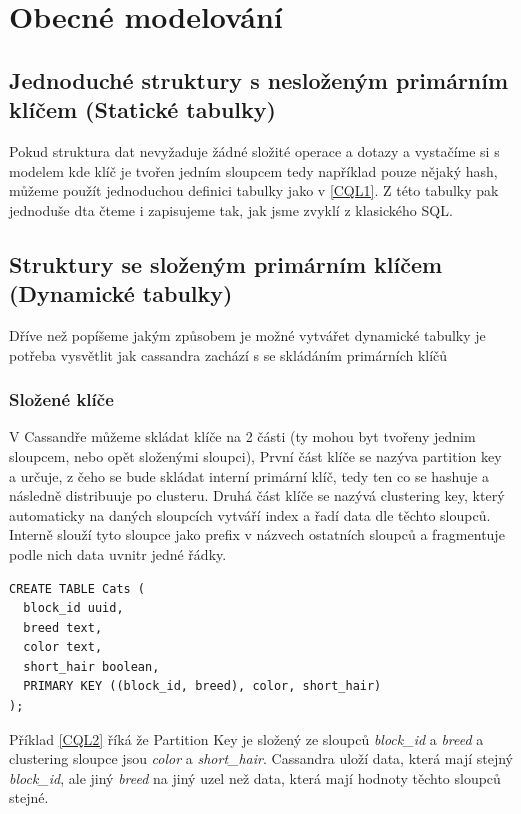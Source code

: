 \documentclass[thesis=M,czech]{FITthesis}[2012/06/26]
\begin{document}
\section{Obecné modelování}

\subsection{Jednoduché struktury s nesloženým primárním klíčem (Statické tabulky)}

Pokud struktura dat nevyžaduje žádné složité operace a dotazy a vystačíme si s modelem kde klíč je tvořen jedním sloupcem tedy například pouze nějaký hash, můžeme použít jednoduchou definici tabulky jako v \ref{CQL1}. Z této tabulky pak jednoduše dta čteme i zapisujeme tak, jak jsme zvyklí z klasického SQL.

\subsection{Struktury se složeným primárním klíčem (Dynamické tabulky)}

Dříve než popíšeme jakým způsobem je možné vytvářet dynamické tabulky je potřeba vysvětlit jak cassandra zachází s se skládáním primárních klíčů

\subsubsection*{Složené klíče}
V Cassandře můžeme skládat klíče na 2 části (ty mohou byt tvořeny jednim sloupcem, nebo opět složenými sloupci), První část klíče se nazýva partition key a určuje, z čeho se bude skládat interní primární klíč, tedy ten co se hashuje a následně distribuuje po clusteru. Druhá část klíče se nazývá clustering key, který automaticky na daných sloupcích vytváří index a řadí data dle těchto sloupců. Interně slouží tyto sloupce jako prefix v názvech ostatních sloupců a fragmentuje podle nich data uvnitr jedné řádky. 

\begin{lstlisting}[caption={Ukázka složených klíčů},label=CQL2]
CREATE TABLE Cats (
  block_id uuid,
  breed text,
  color text,
  short_hair boolean,
  PRIMARY KEY ((block_id, breed), color, short_hair)
);
\end{lstlisting}

Příklad \ref{CQL2} říká že Partition Key je složený ze sloupců \emph{block\_id} a  \emph{breed} a clustering sloupce jsou \emph{color} a \emph{short\_hair}. Cassandra uloží data, která mají stejný \emph{block\_id}, ale jiný \emph{breed} na jiný uzel než data, která mají hodnoty těchto sloupců stejné.  
\end{document}

